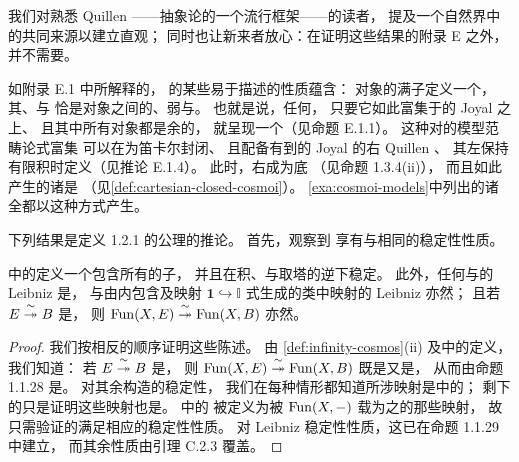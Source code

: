 我们对熟悉 Quillen \trModelCategory——抽象\trHomotopy{}论的一个流行框架——的读者，
提及一个自然界中\trInfinityCosmos{}的共同来源以建立直观；
同时也让新来者放心：在证明这些结果的附录 E 之外，
并不需要\trModelCategory{}。

\begin{digression}\label{dig:source-cosmoi-nature}
如附录 E.1 中所解释的，
\trModelCategory{}的某些易于描述的性质蕴含：
\trFibration{}对象的满子\trCategory{}定义一个\trInfinityCosmos{}，
其\trIsofibration{}、\trEquivalence{}与\trTrivialFibration
恰是\trFibration{}对象之间的\trFibration{}、弱\trEquivalence{}与\trTrivialFibration{}。
也就是说，任何\trModelCategory{}，
只要它如此富集于\trSimplicialSet{}的 Joyal \trModelStructure{}之上、
且其中所有\trFibration{}对象都是余\trFibration{}的，
就呈现一个\trInfinityCosmos{}（见命题 E.1.1）。
这种对\trQuasiCategory{}的模型范畴论式富集
可以在\trModelCategory{}为笛卡尔封闭、
且配备有到\trSimplicialSet{}的 Joyal \trModelStructure{}的右 Quillen \trAdjunction{}、
其左\trAdjunction{}保持有限积时定义（见推论 E.1.4）。
此时，右\trAdjunction{}成为底\trQuasiCategory\trFunctor
（见命题 1.3.4(ii)）， %
而且如此产生的诸\trInfinityCosmos{}是\trCartesianClosed
（见\cref{def:cartesian-closed-cosmoi}）。
\cref{exa:cosmoi-models}中列出的诸\trInfinityCosmos{}全都以这种方式产生。
\end{digression}

下列结果是定义 1.2.1 的公理的推论。
首先，观察到\trTrivialFibration
享有与\trIsofibration{}相同的稳定性性质。

\begin{lemma}\label{lem:trivial-fibration-stability}
\trInfinityCosmos{}中的\trTrivialFibration{}定义一个包含所有\trIsomorphism{}的子\trCategory{}，
并且在积、\trPullback{}与取塔的逆\trLimit{}下稳定。
此外，任何\trTrivialFibration{}与\trSimplicialSet{}\trMonomorphism{}的 Leibniz \trCotensor{}是\trTrivialFibration{}， %
\trIsofibration{}与由内\trHorn{}包含及映射
$\mathbf{1}\hookrightarrow\mathbb{I}$
\trCell{}式生成的类中映射的 Leibniz \trCotensor{}亦然；
且若 $E\mathrel{\stackrel{\sim}{\twoheadrightarrow}} B$ 是\trTrivialFibration{}，
则 $\operatorname{Fun}(X,E)\mathrel{\stackrel{\sim}{\twoheadrightarrow}}\operatorname{Fun}(X,B)$ 亦然。
\end{lemma}
\begin{proof}
我们按相反的顺序证明这些陈述。
由 \cref{def:infinity-cosmos}(ii) 及\trInfinityCosmos{}中\trTrivialFibration{}的定义，我们知道：
若 $E\mathrel{\stackrel{\sim}{\twoheadrightarrow}} B$ 是\trTrivialFibration{}，
则 $\operatorname{Fun}(X,E)\mathrel{\stackrel{\sim}{\twoheadrightarrow}}\operatorname{Fun}(X,B)$
既是\trIsofibration{}又是\trEquivalence{}，
从而由命题 1.1.28 是\trTrivialFibration{}。 %
对其余构造的稳定性，
我们在每种情形都知道所涉映射是\trInfinityCosmos{}中的\trIsofibration{}；
剩下的只是证明这些映射也是\trEquivalence{}。
\trInfinityCosmos{}中的\trEquivalence{}%
被定义为被 $\operatorname{Fun}(X,-)$ 载为\trQuasiCategory{}之\trEquivalence{}的那些映射，
故只需验证\trQuasiCategory{}的\trTrivialFibration{}满足相应的稳定性性质。
对 Leibniz 稳定性性质，这已在命题 1.1.29 中建立，
而其余性质由引理 C.2.3 覆盖。
\end{proof}

